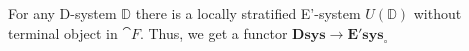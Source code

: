 \begin{comment}
\begin{rmk}
In the following definition, one could take the underlying category of the
E-system $\mathcal{E}(\mathbb{D})$ associated to a D-system $\mathbb{D}$ to
be the subcategory generated by the projections $p_A$, and construct the
rest of the structure of E-systems on top of that. However, it is not so easy
to characterize the image of the functor $\mathcal{E}$ in that case. Intuitively,
D-systems should correspond to locally stratified E-systems. To be able to prove
such a theorem, we've gone with a slightly modified definition of the underlying
category.
\end{rmk}
\end{comment}

\begin{defn}
For any D-system $\mathbb{D}$ there is 
a locally stratified E'-system $U(\mathbb{D})$ without terminal object in 
$\cat{F}$. Thus, we get a functor $\mathbf{Dsys}\to\mathbf{E'sys}_{\circ}$
\end{defn}

